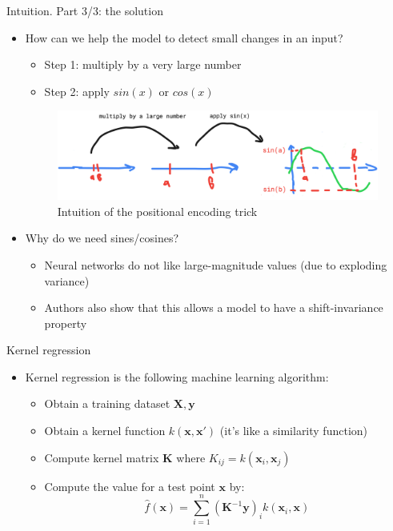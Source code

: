 \documentclass[handout, 10pt]{beamer}
\begin{document}
\begin{frame}{Intuition. Part 3/3: the solution}
\begin{itemize}
    \item\pause How can we help the model to detect small changes in an input?
    \begin{itemize}
        \item\pause Step 1: multiply by a very large number
        \item\pause Step 2: apply $sin(x)$ or $cos(x)$
    \end{itemize}
    \begin{figure}
        \centering
        \includegraphics[width=\textwidth]{images/intuition-illustration}
        \caption{Intuition of the positional encoding trick}
    \end{figure}

    \item\pause Why do we need sines/cosines?
    \begin{itemize}
        \item\pause Neural networks do not like large-magnitude values (due to exploding variance)
        \item\pause Authors also show that this allows a model to have a shift-invariance property
    \end{itemize}
\end{itemize}
\end{frame}

\begin{frame}{Kernel regression}
\begin{itemize}
    \item\pause Kernel regression is the following machine learning algorithm:
    \begin{itemize}
        \item\pause Obtain a training dataset $\bm X, \bm y$
        \item\pause Obtain a kernel function $k(\bm x,\bm x')$ (it's like a similarity function)
        \item\pause Compute kernel matrix $\bm K$ where $K_{ij} = k(\bm x_i, \bm x_j)$
        \item\pause Compute the value for a test point $\bm x$ by:
        \begin{equation}
\hat{f}(\mathbf{x})=\sum_{i=1}^{n}\left(\mathbf{K}^{-1} \mathbf{y}\right)_{i} k\left(\mathbf{x}_{i}, \mathbf{x}\right)
\end{equation}
    \end{itemize}
\end{itemize}
\end{frame}
\end{document}
